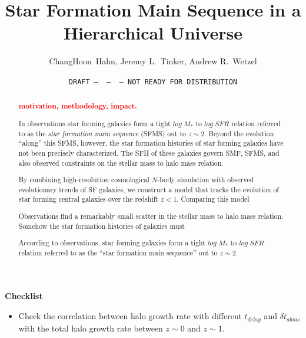 \documentclass[12pt, letterpaper, preprint]{aastex}
\newcommand{\todo}[1]{{\bf \textcolor{red}{ #1}}}
\newcommand{\bitem}{\begin{itemize}}
\newcommand{\eitem}{\end{itemize}}
\begin{document}
\sloppy\sloppypar\frenchspacing

\title{Star Formation Main Sequence in a Hierarchical Universe} 
\date{\texttt{DRAFT~---~\githash~---~\gitdate~---~NOT READY FOR DISTRIBUTION}}
\author{ChangHoon~Hahn, 
Jeremy L.~Tinker, 
Andrew R.~Wetzel}

\begin{abstract}
    \todo{motivation, methodology, impact.}
    
    In observations star forming galaxies form a tight $log\;M_*$ to $log\;SFR$ 
    relation referred to as the {\em star formation main sequence} (SFMS) out to $z\sim2$. 
    Beyond the evolution ``along'' this SFMS, however, the star formation histories of star 
    forming galaxies have not been precisely characterized. 
    The SFH of these galaxies govern SMF, SFMS, and also observed constraints on the stellar mass to halo mass
    relation. 

    By combining high-resolution cosmological $N$-body simulation with observed evolutionary 
    trends of SF galaxies, we construct a model that tracks the evolution of star forming 
    central galaxies over the redshift $z < 1$. Comparing this model 

    Observations find a remarkably small scatter in the stellar mass to halo mass relation. 
    Somehow the star formation histories of galaxies must 
    
    According to observations, star forming galaxies form a tight $log\;M_*$ to $log\;SFR$ 
    relation referred to as the ``star formation main sequence'' out to $z\sim2$. 
\end{abstract}


{\bf Checklist} 
\bitem
\item Check the correlation between halo growth rate with different $t_{delay}$ and $\delta t_{abias}$ with the total halo growth rate between $z \sim 0$ and $z \sim 1$. 
\eitem 
\end{document}
